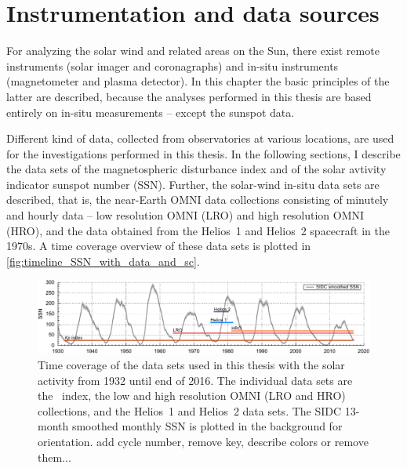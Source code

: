 \chapter{Instrumentation and data sources}
\label{chap:data}
For analyzing the solar wind and related areas on the Sun, there exist remote instruments (solar imager and coronagraphs) and in-situ instruments (magnetometer and plasma detector). In this chapter the basic principles of the latter are described, because the analyses performed in this thesis are based entirely on in-situ measurements -- except the sunspot data.

Different kind of data, collected from observatories at various locations, are used for the investigations performed in this thesis. In the following sections, I describe the data sets of the magnetospheric disturbance index \Kp{} and of the solar avtivity indicator sunspot number (SSN). Further, the solar-wind in-situ data sets are described, that is, the near-Earth OMNI data collections consisting of minutely and hourly data -- low resolution OMNI (LRO) and high resolution OMNI (HRO), and the data obtained from the Helios~1 and Helios~2 spacecraft in the 1970s. A time coverage overview of these data sets is plotted in \autoref{fig:timeline_SSN_with_data_and_sc}.\\
\begin{figure}[htb]
	\centering
	\includegraphics[width=\textwidth]{figures_of_mine/gnuplots/timeline_SSN_with_data_and_sc.pdf}
	\caption{Time coverage of the data sets used in this thesis with the solar activity from 1932 until end of 2016. The individual data sets are the \Kp~index, the low and high resolution OMNI (LRO and HRO) collections, and the Helios~1 and Helios~2 data sets. The SIDC 13-month smoothed monthly SSN is plotted in the background for orientation. add cycle number, remove key, describe colors or remove them...}
	\label{fig:timeline_SSN_with_data_and_sc}
\end{figure}
% 
